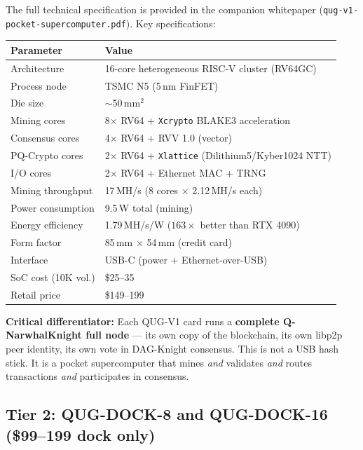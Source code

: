 \documentclass[11pt,a4paper]{article}
\begin{document}
The full technical specification is provided in the companion whitepaper (\texttt{qug-v1-pocket-supercomputer.pdf}). Key specifications:

\begin{center}
\begin{tabular}{@{}ll@{}}
\toprule
\textbf{Parameter} & \textbf{Value} \\
\midrule
Architecture & 16-core heterogeneous RISC-V cluster (RV64GC) \\
Process node & TSMC N5 (5\,nm FinFET) \\
Die size & $\sim$50\,mm$^2$ \\
Mining cores & 8$\times$ RV64 + \texttt{Xcrypto} BLAKE3 acceleration \\
Consensus cores & 4$\times$ RV64 + RVV 1.0 (vector) \\
PQ-Crypto cores & 2$\times$ RV64 + \texttt{Xlattice} (Dilithium5/Kyber1024 NTT) \\
I/O cores & 2$\times$ RV64 + Ethernet MAC + TRNG \\
Mining throughput & 17\,MH/s (8 cores $\times$ 2.12\,MH/s each) \\
Power consumption & 9.5\,W total (mining) \\
Energy efficiency & 1.79\,MH/s/W ($163\times$ better than RTX 4090) \\
Form factor & 85\,mm $\times$ 54\,mm (credit card) \\
Interface & USB-C (power + Ethernet-over-USB) \\
SoC cost (10K vol.) & \$25--35 \\
Retail price & \$149--199 \\
\bottomrule
\end{tabular}
\end{center}

\textbf{Critical differentiator:} Each QUG-V1 card runs a \textbf{complete Q-NarwhalKnight full node} --- its own copy of the blockchain, its own libp2p peer identity, its own vote in DAG-Knight consensus. This is not a USB hash stick. It is a pocket supercomputer that mines \textit{and} validates \textit{and} routes transactions \textit{and} participates in consensus.

\subsection{Tier 2: QUG-DOCK-8 and QUG-DOCK-16 (\$99--199 dock only)}
\end{document}
